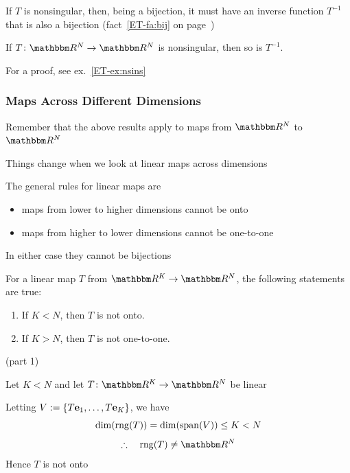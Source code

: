 \begin{frame}
    
    \vspace{2em}
    If $T$ is nonsingular, then, being a bijection, it must have an inverse
    function $T^{-1}$ that is also a bijection (fact~\ref{ET-fa:bij} on
    page~\pageref{ET-fa:bij})

    \vspace{.7em}
    \Fact{\eqref{ET-fa:nsins}}
        If $T \colon \RR^N \to \RR^N$ is nonsingular, then so is $T^{-1}$.  

    For a proof, see ex.~\ref{ET-ex:nsins}
    
\end{frame}

\begin{frame}

    \frametitle{Maps Across Different Dimensions} 

    \vspace{2em}
    Remember that the above results apply to maps from $\RR^N$ to $\RR^N$

    Things change when we look at linear maps across dimensions

    \vspace{.7em}

    The general rules for linear maps are 

    \begin{itemize}
        \item maps from lower to higher dimensions cannot be onto
        \item maps from higher to lower dimensions cannot be one-to-one
    \end{itemize}

    In either case they cannot be bijections

    \vspace{1em}

\end{frame}

\begin{frame}
    
    \vspace{2em}
    \Thm{\eqref{ET-t:lfoc}}
    For a linear map $T$ from $\RR^K \to \RR^N$, the following statements are
    true:
    \begin{enumerate}
        \item If $K < N$, then $T$ is not onto.
        \item If $K > N$, then $T$ is not one-to-one.
    \end{enumerate}
    \Prf(part 1)
    
    Let $K < N$ and let $T \colon \RR^K \to \RR^N$ be linear  
    
    Letting $V := \{T{\mathbf e}_1, \ldots, T{\mathbf e}_K\}$, we have
    $$
    \dim(\operatorname{rng}(T)) = \dim(\operatorname{span}(V)) \leq K < N
    $$
    $$
    \fore 
        \range(T) \not= \RR^N
    $$
    Hence $T$ is not onto 
    
\end{frame}

